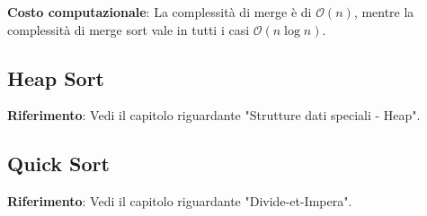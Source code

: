 \documentclass[../cheatSheetAlgoritmi.tex]{subfiles}
\begin{document}
\textbf{Costo computazionale}: La complessità di merge è di $\mathcal{O}(n)$, mentre la complessità di merge sort vale in tutti i casi $\mathcal{O}(n\log{}n)$.\

\subsection{Heap Sort}
\textbf{Riferimento}: Vedi il capitolo riguardante "Strutture dati speciali - Heap".\

\subsection{Quick Sort}
\textbf{Riferimento}: Vedi il capitolo riguardante "Divide-et-Impera".\

\newpage
\end{document}
